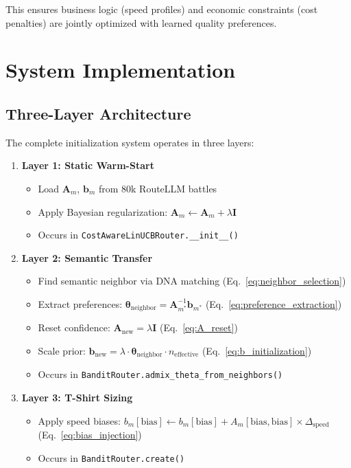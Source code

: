 \documentclass[sigconf]{acmart}
\begin{document}
This ensures business logic (speed profiles) and economic constraints (cost penalties) are jointly optimized with learned quality preferences.

\section{System Implementation}

\subsection{Three-Layer Architecture}

The complete initialization system operates in three layers:

\begin{enumerate}
    \item \textbf{Layer 1: Static Warm-Start}
    \begin{itemize}
        \item Load $\mathbf{A}_m$, $\mathbf{b}_m$ from 80k RouteLLM battles
        \item Apply Bayesian regularization: $\mathbf{A}_m \leftarrow \mathbf{A}_m + \lambda \mathbf{I}$
        \item Occurs in \texttt{CostAwareLinUCBRouter.\_\_init\_\_()}
    \end{itemize}
    
    \item \textbf{Layer 2: Semantic Transfer}
    \begin{itemize}
        \item Find semantic neighbor via DNA matching (Eq.~\ref{eq:neighbor_selection})
        \item Extract preferences: $\boldsymbol{\theta}_{\text{neighbor}} = \mathbf{A}_{m^*}^{-1} \mathbf{b}_{m^*}$ (Eq.~\ref{eq:preference_extraction})
        \item Reset confidence: $\mathbf{A}_{\text{new}} = \lambda \mathbf{I}$ (Eq.~\ref{eq:A_reset})
        \item Scale prior: $\mathbf{b}_{\text{new}} = \lambda \cdot \boldsymbol{\theta}_{\text{neighbor}} \cdot n_{\text{effective}}$ (Eq.~\ref{eq:b_initialization})
        \item Occurs in \texttt{BanditRouter.admix\_theta\_from\_neighbors()}
    \end{itemize}
    
    \item \textbf{Layer 3: T-Shirt Sizing}
    \begin{itemize}
        \item Apply speed biases: $b_m[\text{bias}] \leftarrow b_m[\text{bias}] + A_m[\text{bias}, \text{bias}] \times \Delta_{\text{speed}}$ (Eq.~\ref{eq:bias_injection})
        \item Occurs in \texttt{BanditRouter.create()}
    \end{itemize}
\end{enumerate}
\end{document}
